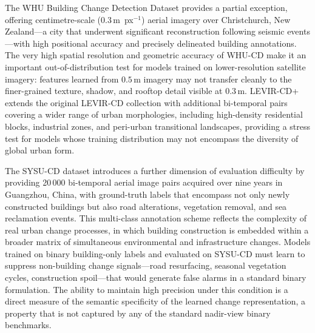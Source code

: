 The WHU Building Change Detection Dataset \cite{Ji2019WHU} provides a partial
exception, offering centimetre-scale ($0.3\,\mathrm{m}$~px$^{-1}$) aerial
imagery over Christchurch, New Zealand---a city that underwent significant
reconstruction following seismic events---with high positional accuracy and
precisely delineated building annotations. The very high spatial resolution
and geometric accuracy of WHU-CD make it an important out-of-distribution
test for models trained on lower-resolution satellite imagery: features learned
from $0.5\,\mathrm{m}$ imagery may not transfer cleanly to the finer-grained
texture, shadow, and rooftop detail visible at $0.3\,\mathrm{m}$. LEVIR-CD+
\cite{LevirCDPlus} extends the original LEVIR-CD collection with additional
bi-temporal pairs covering a wider range of urban morphologies, including
high-density residential blocks, industrial zones, and peri-urban transitional
landscapes, providing a stress test for models whose training distribution may
not encompass the diversity of global urban form.

The SYSU-CD dataset \cite{ShiSYSU2022} introduces a further dimension of
evaluation difficulty by providing 20\,000 bi-temporal aerial image pairs
acquired over nine years in Guangzhou, China, with ground-truth labels that
encompass not only newly constructed buildings but also road alterations,
vegetation removal, and sea reclamation events. This multi-class annotation
scheme reflects the complexity of real urban change processes, in which
building construction is embedded within a broader matrix of simultaneous
environmental and infrastructure changes. Models trained on binary
building-only labels and evaluated on SYSU-CD must learn to suppress
non-building change signals---road resurfacing, seasonal vegetation cycles,
construction spoil---that would generate false alarms in a standard binary
formulation. The ability to maintain high precision under this condition is a
direct measure of the semantic specificity of the learned change representation,
a property that is not captured by any of the standard nadir-view binary
benchmarks.

